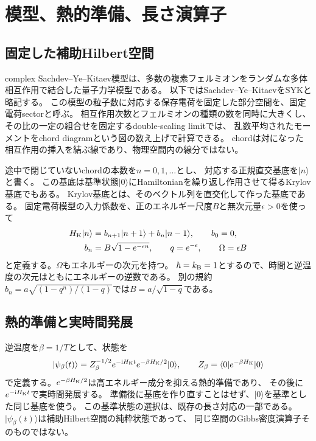 \documentclass[a4paper,11pt]{ltjsarticle}
\numberwithin{equation}{section}
\newcommand{\ket}[1]{\lvert #1\rangle}
\newcommand{\bra}[1]{\langle #1\rvert}
\newcommand{\ii}{\mathrm i}
\begin{document}
\section{模型、熱的準備、長さ演算子}
\subsection{固定した補助Hilbert空間}
complex Sachdev--Ye--Kitaev模型は、多数の複素フェルミオンをランダムな多体相互作用で結合した量子力学模型である。
以下ではSachdev--Ye--KitaevをSYKと略記する。
この模型の粒子数に対応する保存電荷を固定した部分空間を、固定電荷sectorと呼ぶ。
相互作用次数とフェルミオンの種類の数を同時に大きくし、その比の一定の組合せを固定するdouble-scaling limitでは、
乱数平均されたモーメントをchord diagramという図の数え上げで計算できる。
chordは対になった相互作用の挿入を結ぶ線であり、物理空間内の線分ではない。

途中で閉じていないchordの本数を$n=0,1,\ldots$とし、
対応する正規直交基底を$\ket n$と書く。
この基底は基準状態$\ket0$にHamiltonianを繰り返し作用させて得るKrylov基底でもある。
Krylov基底とは、そのベクトル列を直交化して作った基底である。
固定電荷模型の入力係数\cite{Forste}を、正のエネルギー尺度$B$と無次元量$\epsilon>0$を使って
\begin{align}
 H_{\rm K}\ket n&=b_{n+1}\ket{n+1}+b_n\ket{n-1},\qquad b_0=0,
 \label{eq:ham}\\
 b_n&=B\sqrt{1-e^{-\epsilon n}},\qquad
 q=e^{-\epsilon},\qquad \Omega=\epsilon B
 \label{eq:parameters}
\end{align}
と定義する。$\Omega$もエネルギーの次元を持つ。
$\hbar=k_{\rm B}=1$とするので、時間と逆温度の次元はともにエネルギーの逆数である。
別の規約$b_n=a\sqrt{(1-q^n)/(1-q)}$では$B=a/\sqrt{1-q}$である。

\subsection{熱的準備と実時間発展}
逆温度を$\beta=1/T$として、状態を
\begin{equation}
 \ket{\psi_\beta(t)}=Z_\beta^{-1/2}
 e^{-\ii H_{\rm K}t}e^{-\beta H_{\rm K}/2}\ket0,
 \qquad Z_\beta=\bra0e^{-\beta H_{\rm K}}\ket0
 \label{eq:thermalstate}
\end{equation}
で定義する。$e^{-\beta H_{\rm K}/2}$は高エネルギー成分を抑える熱的準備であり、
その後に$e^{-\ii H_{\rm K}t}$で実時間発展する。
準備後に基底を作り直すことはせず、$\ket0$を基準とした同じ基底を使う。
この基準状態の選択は、既存の長さ対応の一部である\cite{Heller}。
$\ket{\psi_\beta(t)}$は補助Hilbert空間の純粋状態であって、
同じ空間のGibbs密度演算子そのものではない。
\end{document}
